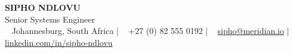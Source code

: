 \documentclass[10pt,a4paper]{article}
\begin{document}
\begin{tcolorbox}[colback=primary, colframe=primary, arc=0mm, outer arc=0mm, top=10pt, bottom=10pt, left=15pt, right=15pt, boxrule=0pt]
    \centering
    {\Huge \bfseries \color{white} SIPHO NDLOVU} \\[\smallskipamount]
    {\large \sffamily \color{white!80} Senior Systems Engineer} \\[\medskipamount]
    {\small \color{white!95}
        \faMapMarker ~ Johannesburg, South Africa \quad | \quad 
        \faPhone ~ +27 (0) 82 555 0192 \quad | \quad 
        \faEnvelope ~ \href{mailto:sipho@meridian.io}{\color{white} sipho@meridian.io} \quad | \quad 
        \faLinkedin ~ \href{https://linkedin.com/in/sipho-ndlovu}{\color{white} linkedin.com/in/sipho-ndlovu}
    }
\end{tcolorbox}

\vspace{0.2cm}
\end{document}
